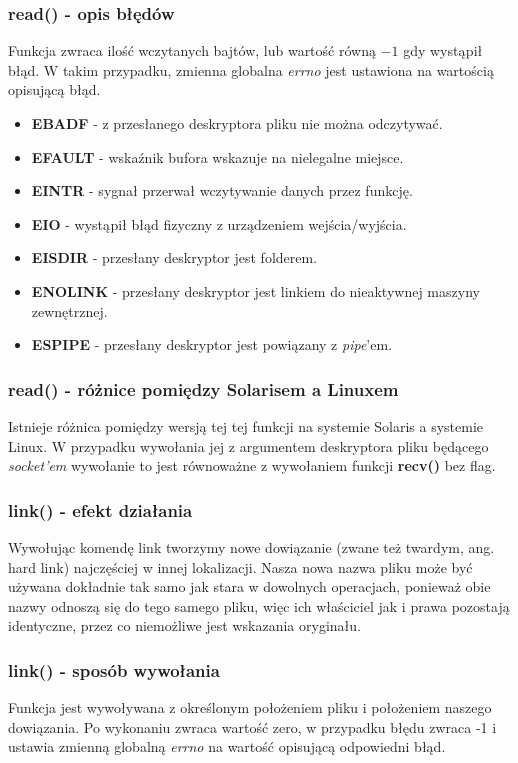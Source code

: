 \documentclass{beamer}
\begin{document}
\begin{frame}
	\frametitle{read() - opis błędów}
Funkcja zwraca ilość wczytanych bajtów, lub wartość równą $-1$ gdy wystąpił błąd.
W takim przypadku, zmienna globalna \textit{errno} jest ustawiona na wartością opisującą błąd.

\begin{itemize}
\item \textbf{EBADF} - z przesłanego deskryptora pliku nie można odczytywać.
\item \textbf{EFAULT} - wskaźnik bufora wskazuje na nielegalne miejsce.
\item \textbf{EINTR} - sygnał przerwał wczytywanie danych przez funkcję.
\item \textbf{EIO} - wystąpił błąd fizyczny z urządzeniem wejścia/wyjścia.
\item \textbf{EISDIR} - przesłany deskryptor jest folderem.
\item \textbf{ENOLINK} - przesłany deskryptor jest linkiem do nieaktywnej maszyny zewnętrznej.
\item \textbf{ESPIPE} - przesłany deskryptor jest powiązany z \textit{pipe}'em.
\end{itemize}
\end{frame}

\begin{frame}
	\frametitle{read() - różnice pomiędzy Solarisem a Linuxem}
Istnieje różnica pomiędzy wersją tej tej funkcji na systemie Solaris a systemie Linux.
W przypadku wywołania jej z argumentem deskryptora pliku będącego \textit{socket'em} wywołanie to jest równoważne z wywołaniem funkcji \textbf{recv()} bez flag.
\end{frame}

\begin{frame}
	\frametitle{link() - efekt działania}
Wywołując komendę link tworzymy nowe dowiązanie (zwane też twardym, ang. hard link) najczęściej w innej lokalizacji. Nasza nowa nazwa pliku może być używana dokładnie tak samo jak stara w dowolnych operacjach, ponieważ obie nazwy odnoszą się do tego samego pliku, więc ich właściciel jak i prawa pozostają identyczne, przez co niemożliwe jest wskazania oryginału.
\end{frame}

\begin{frame}
	\frametitle{link() - sposób wywołania}
Funkcja jest wywoływana z określonym położeniem pliku i położeniem naszego dowiązania. Po wykonaniu zwraca wartość zero, w przypadku błędu zwraca -1 i ustawia zmienną globalną \textit{errno} na wartość opisującą odpowiedni błąd.
\end{frame}
\end{document}
